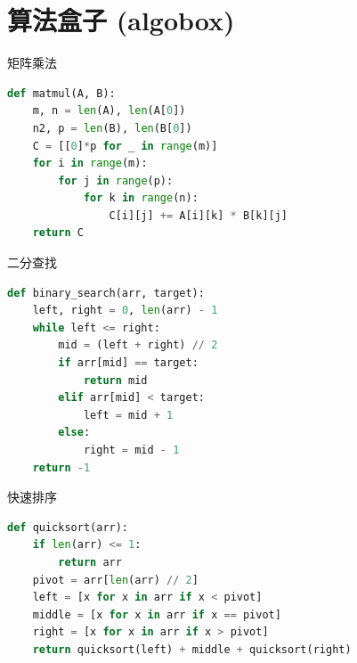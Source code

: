 \section{算法盒子 (algobox)}\label{sec:algobox}

\begin{algobox}{矩阵乘法}
\begin{lstlisting}[language=Python]
def matmul(A, B):
    m, n = len(A), len(A[0])
    n2, p = len(B), len(B[0])
    C = [[0]*p for _ in range(m)]
    for i in range(m):
        for j in range(p):
            for k in range(n):
                C[i][j] += A[i][k] * B[k][j]
    return C
\end{lstlisting}
\end{algobox}

\begin{algobox}{二分查找}
\begin{lstlisting}[language=Python]
def binary_search(arr, target):
    left, right = 0, len(arr) - 1
    while left <= right:
        mid = (left + right) // 2
        if arr[mid] == target:
            return mid
        elif arr[mid] < target:
            left = mid + 1
        else:
            right = mid - 1
    return -1
\end{lstlisting}
\end{algobox}

\begin{algobox}{快速排序}
\begin{lstlisting}[language=Python]
def quicksort(arr):
    if len(arr) <= 1:
        return arr
    pivot = arr[len(arr) // 2]
    left = [x for x in arr if x < pivot]
    middle = [x for x in arr if x == pivot]
    right = [x for x in arr if x > pivot]
    return quicksort(left) + middle + quicksort(right)
\end{lstlisting}
\end{algobox}